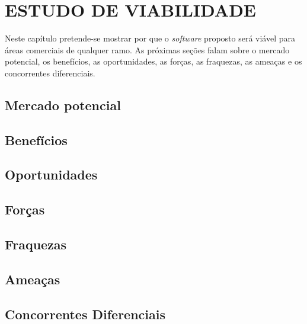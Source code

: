 \chapter{ESTUDO DE VIABILIDADE} \label{estudo}

Neste capítulo pretende-se mostrar por que o \textit{software} proposto será viável para áreas comerciais de qualquer ramo. As próximas seções falam sobre o mercado potencial, os benefícios, as oportunidades, as forças, as fraquezas, as ameaças e os concorrentes diferenciais.

\section{Mercado potencial}

\section{Benefícios}

\section{Oportunidades}

\section{Forças}

\section{Fraquezas}


\section{Ameaças}


\section{Concorrentes Diferenciais}

